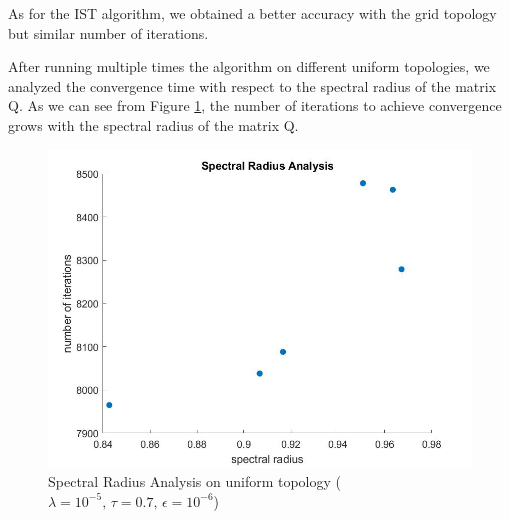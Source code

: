 As for the IST algorithm, we obtained a better accuracy with the grid topology but similar number of iterations.\par

After running multiple times the algorithm on different uniform topologies, we analyzed the convergence time with respect to the 
spectral radius of the matrix Q. As we can see from Figure \ref{fig: spectral radius analysis}, the number of iterations to achieve 
convergence grows with the spectral radius of the matrix Q.

\begin{figure}[H]
    \centering
    \includegraphics[width=.5\textwidth]{img/spectral_radius_analysis.jpg}
    \caption{Spectral Radius Analysis on uniform topology ($\lambda=10^{-5},\,\tau=0.7,\,\epsilon=10^{-6}$)}
    \label{fig: spectral radius analysis}
\end{figure}